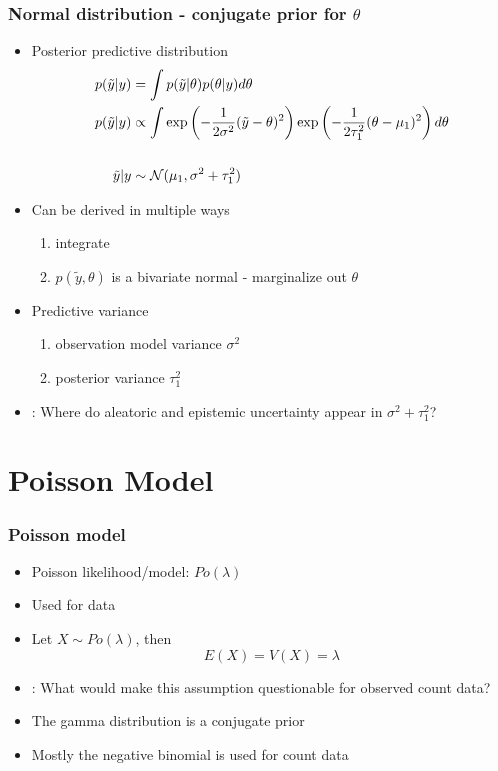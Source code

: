 \documentclass[10pt]{beamer}
\begin{document}
\begin{frame}
  \frametitle{Normal distribution - conjugate prior for $\theta$}
  \begin{itemize}
  \item Posterior predictive distribution
    \begin{align*}
      p(\tilde{y}|y)&=\int p(\tilde{y}|\theta)p(\theta|y) d\theta \\
      p(\tilde{y}|y)& \propto \int
      \exp\left(-\frac{1}{2\sigma^2}(\tilde{y}-\theta)^2\right)\exp\left(-\frac{1}{2\tau_1^2}(\theta-\mu_1)^2\right) d\theta \\
      ~&~\\
      \tilde{y}|y &\sim \mathcal{N}(\mu_1,\sigma^2+\tau_1^2)
    \end{align*}
  \pause
  \item Can be derived in multiple ways
  \begin{enumerate}
    \item integrate
    \item $p(\tilde{y},\theta)$ is a bivariate normal - marginalize out $\theta$
  \end{enumerate}
  \item Predictive variance
  \begin{enumerate}
    \item observation model variance $\sigma^2$
    \item posterior variance $\tau_1^2$
  \end{enumerate}
  \pause
  \item {}: Where do aleatoric and epistemic uncertainty
    appear in $\sigma^2+\tau_1^2$?
  \end{itemize}
\end{frame}

\section{Poisson Model}

\begin{frame}
  \frametitle{Poisson model}
  \begin{itemize}
  \item Poisson likelihood/model: $Po(\lambda)$
  \item Used for  data
  \pause
  \item Let $X \sim Po(\lambda)$, then
  \[
  E(X) = V(X) = \lambda
  \]
  \item {}: What would make this assumption questionable
    for observed count data?
  \pause
  \item The gamma distribution is a conjugate prior
  \pause
  \item {} Mostly the negative binomial is used for count data
  \end{itemize}
\end{frame}
\end{document}
